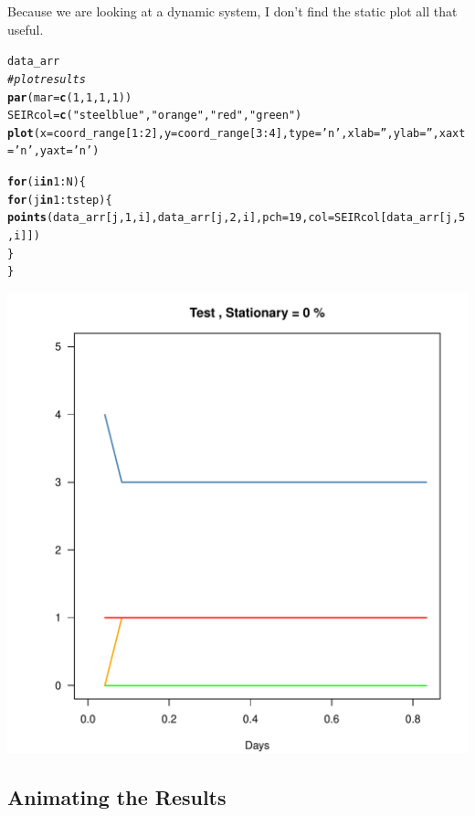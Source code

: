 \documentclass{article}\usepackage[]{graphicx}\usepackage[]{color}
\makeatletter
\def\maxwidth{ %
  \ifdim\Gin@nat@width>\linewidth
    \linewidth
  \else
    \Gin@nat@width
  \fi
}
\newcommand{\hlnum}[1]{\textcolor[rgb]{0.686,0.059,0.569}{#1}}%
\newcommand{\hlstr}[1]{\textcolor[rgb]{0.192,0.494,0.8}{#1}}%
\newcommand{\hlcom}[1]{\textcolor[rgb]{0.678,0.584,0.686}{\textit{#1}}}%
\newcommand{\hlopt}[1]{\textcolor[rgb]{0,0,0}{#1}}%
\newcommand{\hlstd}[1]{\textcolor[rgb]{0.345,0.345,0.345}{#1}}%
\newcommand{\hlkwa}[1]{\textcolor[rgb]{0.161,0.373,0.58}{\textbf{#1}}}%
\newcommand{\hlkwb}[1]{\textcolor[rgb]{0.69,0.353,0.396}{#1}}%
\newcommand{\hlkwc}[1]{\textcolor[rgb]{0.333,0.667,0.333}{#1}}%
\newcommand{\hlkwd}[1]{\textcolor[rgb]{0.737,0.353,0.396}{\textbf{#1}}}%
\newenvironment{kframe}{%
 \def\at@end@of@kframe{}%
 \ifinner\ifhmode%
  \def\at@end@of@kframe{\end{minipage}}%
  \begin{minipage}{\columnwidth}%
 \fi\fi%
 \def\FrameCommand##1{\hskip\@totalleftmargin \hskip-\fboxsep
 \colorbox{shadecolor}{##1}\hskip-\fboxsep
     \hskip-\linewidth \hskip-\@totalleftmargin \hskip\columnwidth}%
 \MakeFramed {\advance\hsize-\width
   \@totalleftmargin\z@ \linewidth\hsize
   \@setminipage}}%
 {\par\unskip\endMakeFramed%
 \at@end@of@kframe}
\newenvironment{knitrout}{}{} %
\makeatother
\begin{document}
Because we are looking at a dynamic system, I don't find the static plot all that useful. 
\begin{knitrout}
\color{fgcolor}\begin{kframe}
\begin{alltt}
\hlstd{data_arr}
\hlcom{# plot results}
\hlkwd{par}\hlstd{(}\hlkwc{mar}\hlstd{=}\hlkwd{c}\hlstd{(}\hlnum{1}\hlstd{,}\hlnum{1}\hlstd{,}\hlnum{1}\hlstd{,}\hlnum{1}\hlstd{))}
\hlstd{SEIRcol} \hlkwb{=} \hlkwd{c}\hlstd{(}\hlstr{"steelblue"}\hlstd{,} \hlstr{"orange"}\hlstd{,}\hlstr{"red"}\hlstd{,} \hlstr{"green"}\hlstd{)}
\hlkwd{plot}\hlstd{(}\hlkwc{x}\hlstd{=coord_range[}\hlnum{1}\hlopt{:}\hlnum{2}\hlstd{],} \hlkwc{y}\hlstd{=coord_range[}\hlnum{3}\hlopt{:}\hlnum{4}\hlstd{],} \hlkwc{type}\hlstd{=}\hlstr{'n'}\hlstd{,} \hlkwc{xlab}\hlstd{=}\hlstr{''}\hlstd{,} \hlkwc{ylab}\hlstd{=}\hlstr{''}\hlstd{,} \hlkwc{xaxt}\hlstd{=}\hlstr{'n'}\hlstd{,} \hlkwc{yaxt}\hlstd{=}\hlstr{'n'}\hlstd{)}

\hlkwa{for}\hlstd{(i} \hlkwa{in} \hlnum{1}\hlopt{:}\hlstd{N)\{}
  \hlkwa{for}\hlstd{(j} \hlkwa{in} \hlnum{1}\hlopt{:}\hlstd{tstep)\{}
\hlkwd{points}\hlstd{(data_arr[j,}\hlnum{1}\hlstd{,i], data_arr[j,}\hlnum{2}\hlstd{,i],} \hlkwc{pch}\hlstd{=}\hlnum{19}\hlstd{,} \hlkwc{col}\hlstd{=SEIRcol[data_arr[j,}\hlnum{5}\hlstd{,i]])}
  \hlstd{\}}
\hlstd{\}}
\end{alltt}
\end{kframe}
\includegraphics[width=\maxwidth]{figure/unnamed-chunk-3-1} 

\end{knitrout}

\subsection{Animating the Results}
\end{document}
